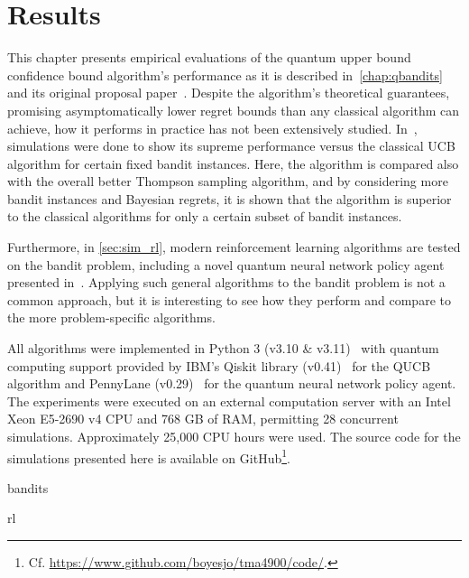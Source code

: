 \chapter{Results}
\label{chap:simulations}

This chapter presents empirical evaluations of the quantum upper bound confidence bound algorithm's performance as it is described in~\cref{chap:qbandits} and its original proposal paper~\autocite{wan2022}.
Despite the algorithm's theoretical guarantees, promising asymptomatically lower regret bounds than any classical algorithm can achieve, how it performs in practice has not been extensively studied.
In~\autocite{wan2022}, simulations were done to show its supreme performance versus the classical UCB algorithm for certain fixed bandit instances.
Here, the algorithm is compared also with the overall better Thompson sampling algorithm, and by considering more bandit instances and Bayesian regrets, it is shown that the algorithm is superior to the classical algorithms for only a certain subset of bandit instances.

Furthermore, in \cref{sec:sim_rl}, modern reinforcement learning algorithms are tested on the bandit problem, including a novel quantum neural network policy agent presented in~\autocite{jerbi2021a}.
Applying such general algorithms to the bandit problem is not a common approach, but it is interesting to see how they perform and compare to the more problem-specific algorithms.

All algorithms were implemented in Python 3 (v3.10 & v3.11)~\autocite{python} with quantum computing support provided by IBM's Qiskit library (v0.41)~\autocite{qiskit} for the QUCB algorithm and PennyLane (v0.29)~\autocite{pennylane} for the quantum neural network policy agent.
The experiments were executed on an external computation server with an Intel Xeon E5-2690 v4 CPU and 768 GB of RAM, permitting 28 concurrent simulations.
Approximately 25,000 CPU hours were used.
The source code for the simulations presented here is available on GitHub\footnote{
    Cf. \url{https://www.github.com/boyesjo/tma4900/code/}.
}.

\clearpage


{bandits}
\clearpage



{rl}

\clearpage

